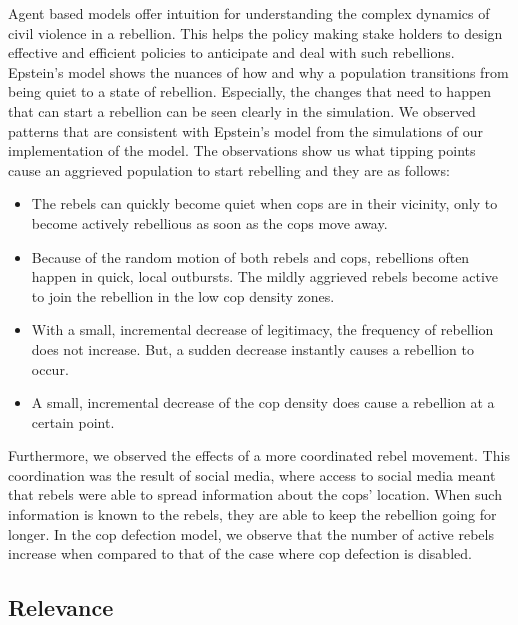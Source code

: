 \documentclass[a4paper,11pt]{article}
\begin{document}
Agent based models offer intuition for understanding the complex dynamics of civil violence in a rebellion. This helps the policy making stake holders to design effective and efficient policies to anticipate and deal with such rebellions. Epstein's model shows the nuances of how and why a population transitions from being quiet to a state of rebellion\cite{epstein2002modeling}. Especially, the changes that need to happen that can start a rebellion can be seen clearly in the simulation. We observed patterns that are consistent with Epstein's model \cite{epstein2002modeling} from the simulations of our implementation of the model. The observations show us what tipping points cause an aggrieved population to start rebelling and they are as follows:
\begin{itemize}
    \item The rebels can quickly become quiet when cops are in their vicinity, only to become actively rebellious as soon as the cops move away.
    \item Because of the random motion of both rebels and cops, rebellions often happen in quick, local outbursts. The mildly aggrieved rebels become active to join the rebellion in the low cop density zones.
    \item With a small, incremental decrease of legitimacy, the frequency of rebellion does not increase. But, a sudden decrease instantly causes a rebellion to occur.
    \item A small, incremental decrease of the cop density does cause a rebellion at a certain point.
\end{itemize}
Furthermore, we observed the effects of a more coordinated rebel movement. This coordination was the result of social media, where access to social media meant that rebels were able to spread information about the cops' location. When such information is known to the rebels, they are able to keep the rebellion going for longer. In the cop defection model, we observe that the number of active rebels increase when compared to that of the case where cop defection is disabled.


\subsection{Relevance}
\end{document}
